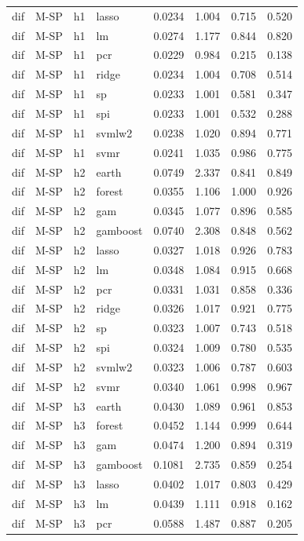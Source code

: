 \begin{ThreePartTable}
\begin{longtable}[t]{llclcccc}
dif & M-SP & h1 & lasso & 0.0234 & 1.004 & 0.715 & 0.520\\
dif & M-SP & h1 & lm & 0.0274 & 1.177 & 0.844 & 0.820\\
dif & M-SP & h1 & pcr & 0.0229 & 0.984 & 0.215 & 0.138\\
dif & M-SP & h1 & ridge & 0.0234 & 1.004 & 0.708 & 0.514\\
dif & M-SP & h1 & sp & 0.0233 & 1.001 & 0.581 & 0.347\\
dif & M-SP & h1 & spi & 0.0233 & 1.001 & 0.532 & 0.288\\
dif & M-SP & h1 & svmlw2 & 0.0238 & 1.020 & 0.894 & 0.771\\
dif & M-SP & h1 & svmr & 0.0241 & 1.035 & 0.986 & 0.775\\
\addlinespace
dif & M-SP & h2 & earth & 0.0749 & 2.337 & 0.841 & 0.849\\
dif & M-SP & h2 & forest & 0.0355 & 1.106 & 1.000 & 0.926\\
dif & M-SP & h2 & gam & 0.0345 & 1.077 & 0.896 & 0.585\\
dif & M-SP & h2 & gamboost & 0.0740 & 2.308 & 0.848 & 0.562\\
dif & M-SP & h2 & lasso & 0.0327 & 1.018 & 0.926 & 0.783\\
dif & M-SP & h2 & lm & 0.0348 & 1.084 & 0.915 & 0.668\\
dif & M-SP & h2 & pcr & 0.0331 & 1.031 & 0.858 & 0.336\\
dif & M-SP & h2 & ridge & 0.0326 & 1.017 & 0.921 & 0.775\\
dif & M-SP & h2 & sp & 0.0323 & 1.007 & 0.743 & 0.518\\
dif & M-SP & h2 & spi & 0.0324 & 1.009 & 0.780 & 0.535\\
dif & M-SP & h2 & svmlw2 & 0.0323 & 1.006 & 0.787 & 0.603\\
dif & M-SP & h2 & svmr & 0.0340 & 1.061 & 0.998 & 0.967\\
\addlinespace
dif & M-SP & h3 & earth & 0.0430 & 1.089 & 0.961 & 0.853\\
dif & M-SP & h3 & forest & 0.0452 & 1.144 & 0.999 & 0.644\\
dif & M-SP & h3 & gam & 0.0474 & 1.200 & 0.894 & 0.319\\
dif & M-SP & h3 & gamboost & 0.1081 & 2.735 & 0.859 & 0.254\\
dif & M-SP & h3 & lasso & 0.0402 & 1.017 & 0.803 & 0.429\\
dif & M-SP & h3 & lm & 0.0439 & 1.111 & 0.918 & 0.162\\
dif & M-SP & h3 & pcr & 0.0588 & 1.487 & 0.887 & 0.205\\

\end{longtable}
\end{ThreePartTable}
